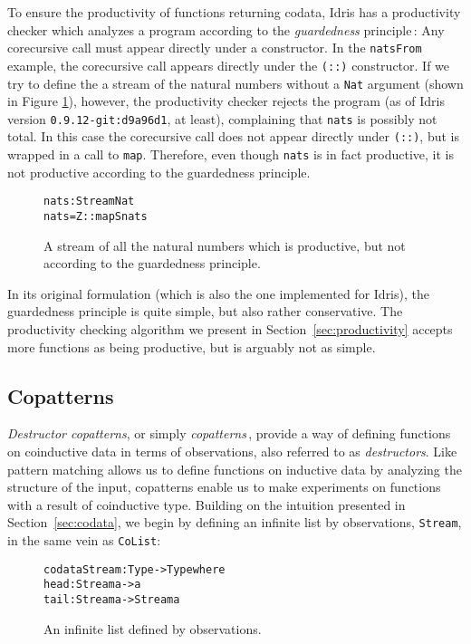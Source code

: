 To ensure the productivity of functions returning codata, Idris has a productivity checker which analyzes a program according to the \emph{guardedness} principle\,\citep{Coquand94,Gimenez95}: Any corecursive call must appear directly under a constructor. In the \texttt{natsFrom} example, the corecursive call appears directly under the \texttt{(::)} constructor. If we try to define the a stream of the natural numbers without a \texttt{Nat} argument (shown in Figure \ref{fig:nats}), however, the productivity checker rejects the program (as of Idris version \texttt{0.9.12-git:d9a96d1}, at least), complaining that \texttt{nats} is possibly not total. In this case the corecursive call does not appear directly under \texttt{(::)}, but is wrapped in a call to \texttt{map}. Therefore, even though \texttt{nats} is in fact productive, it is not productive according to the guardedness principle.

\begin{figure}
\begin{alltt}
nats : Stream Nat
nats = Z :: map S nats
\end{alltt}
\caption{A stream of all the natural numbers which is productive, but not according to the guardedness principle.}
\label{fig:nats}
\end{figure}

In its original formulation (which is also the one implemented for Idris), the guardedness principle is quite simple, but also rather conservative. The productivity checking algorithm we present in Section~\ref{sec:productivity} accepts more functions as being productive, but is arguably not as simple.

\subsection{Copatterns}
\label{sec:copatterns}
\emph{Destructor copatterns}, or simply \emph{copatterns}\,\citep{Abel13Copatterns}, provide a way of defining functions on coinductive data in terms of observations, also referred to as \emph{destructors}. Like pattern matching allows us to define functions on inductive data by analyzing the structure of the input, copatterns enable us to make experiments on functions with a result of coinductive type. Building on the intuition presented in Section~\ref{sec:codata}, we begin by defining an infinite list by observations, \texttt{Stream}, in the same vein as \texttt{CoList}:

\begin{figure}
\begin{alltt}
codata Stream : Type -> Type where
  head : Stream a -> a
  tail : Stream a -> Stream a 
\end{alltt}
\caption{An infinite list defined by observations.}
\label{fig:stream}
\end{figure}

